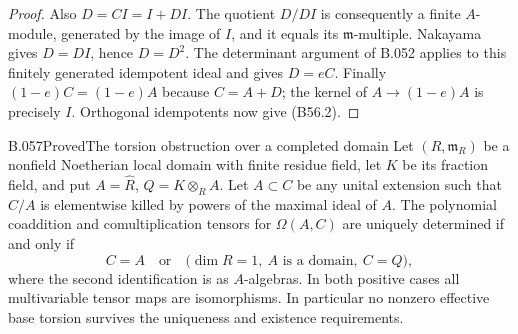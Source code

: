 \begin{proof}
Also $D=CI=I+DI$. The quotient $D/DI$ is consequently
a finite $A$-module, generated by the image of $I$,
and it equals its $\mathfrak m$-multiple. Nakayama
gives $D=DI$, hence $D=D^2$.
The determinant argument of B.052 applies to this
finitely generated idempotent ideal and gives $D=eC$.
Finally $(1-e)C=(1-e)A$ because $C=A+D$; the kernel
of $A\to(1-e)A$ is precisely $I$. Orthogonal
idempotents now give (B56.2).
\end{proof}

\begin{saresult}{B.057}{Proved}{The torsion obstruction over a completed domain}
Let $(R,\mathfrak m_R)$ be a nonfield Noetherian local
domain with finite residue field, let $K$ be its fraction
field, and put $A=\widehat R$, $Q=K\otimes_R A$.
Let $A\subset C$ be any unital extension such that
$C/A$ is elementwise killed by powers of the maximal
ideal of $A$. The polynomial coaddition and
comultiplication tensors for $\Omega(A,C)$ are uniquely
determined if and only if
\[
 C=A\quad\text{or}\quad
 \bigl(\dim R=1,\ A\text{ is a domain},\ C=Q\bigr),       \tag{B57.1}
\]
where the second identification is as $A$-algebras.
In both positive cases all multivariable tensor maps
are isomorphisms. In particular no nonzero effective
base torsion survives the uniqueness and existence
requirements.
\end{saresult}
